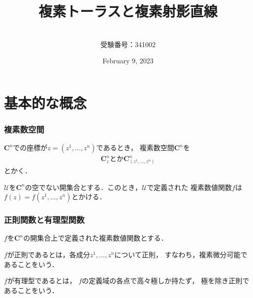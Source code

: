 \documentclass[dvipdfmx,12pt,aspectratio=169]{beamer}%
\newcommand{\cc}{\mathbf{C}}
\newcommand{\mcal}{\mathcal}
\newcommand{\UU}{\mcal{U}}
\begin{document}
    
\title{複素トーラスと複素射影直線}
\date{February 9, 2023}
\author{\\受験番号：341002}




\begin{frame}
    \titlepage
\end{frame}

\section{基本的な概念}

\begin{frame}
    \frametitle{複素数空間}

    $\cc^{n}$での座標が$z=(z^{1},\dots,z^{n})$であるとき，
複素数空間$\cc^{n}$を
\begin{align*}
    \cc^{n}_{z} \text{とか} \cc^{n}_{(z^{1},\dots,z^{n})}
\end{align*}
とかく．

$\UU$を$\cc^n$の空でない開集合とする．このとき，$\UU$で定義された
複素数値関数$f$は$f(z)=f(z^{1},\dots,z^{n})$とかける．
\end{frame}

\begin{frame}
    \frametitle{正則関数と有理型関数}

    $f$を$\cc^n$の開集合上で定義された複素数値関数とする．

    \begin{Definition}[正則関数]
        $f$が正則であるとは，各成分$z^1,\ldots,z^n$について正則，
        すなわち，複素微分可能であることをいう．
    \end{Definition}

    \begin{Definition}[有理型関数]
        $f$が有理型であるとは，
        $f$の定義域の各点で高々極しか持たず，
        極を除き正則であることをいう．
    \end{Definition}

\end{frame}
\end{document}
